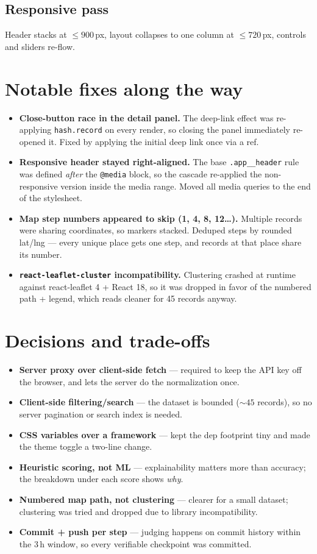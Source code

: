 \documentclass[11pt,a4paper]{article}
\newcommand{\code}[1]{\texttt{\small #1}}
\begin{document}
\subsection{Responsive pass}
Header stacks at $\leq 900$\,px, layout collapses to one column at $\leq 720$\,px, controls and sliders re-flow.

\section{Notable fixes along the way}

\begin{itemize}
  \item \textbf{Close-button race in the detail panel.} The deep-link effect was re-applying \code{hash.record} on every render, so closing the panel immediately re-opened it. Fixed by applying the initial deep link once via a ref.
  \item \textbf{Responsive header stayed right-aligned.} The base \code{.app\_\_header} rule was defined \emph{after} the \code{@media} block, so the cascade re-applied the non-responsive version inside the media range. Moved all media queries to the end of the stylesheet.
  \item \textbf{Map step numbers appeared to skip (1, 4, 8, 12\dots).} Multiple records were sharing coordinates, so markers stacked. Deduped steps by rounded lat/lng --- every unique place gets one step, and records at that place share its number.
  \item \textbf{\code{react-leaflet-cluster} incompatibility.} Clustering crashed at runtime against react-leaflet 4 + React 18, so it was dropped in favor of the numbered path + legend, which reads cleaner for 45 records anyway.
\end{itemize}

\section{Decisions and trade-offs}

\begin{itemize}
  \item \textbf{Server proxy over client-side fetch} --- required to keep the API key off the browser, and lets the server do the normalization once.
  \item \textbf{Client-side filtering/search} --- the dataset is bounded ($\sim 45$ records), so no server pagination or search index is needed.
  \item \textbf{CSS variables over a framework} --- kept the dep footprint tiny and made the theme toggle a two-line change.
  \item \textbf{Heuristic scoring, not ML} --- explainability matters more than accuracy; the breakdown under each score shows \emph{why}.
  \item \textbf{Numbered map path, not clustering} --- clearer for a small dataset; clustering was tried and dropped due to library incompatibility.
  \item \textbf{Commit + push per step} --- judging happens on commit history within the 3\,h window, so every verifiable checkpoint was committed.
\end{itemize}
\end{document}
